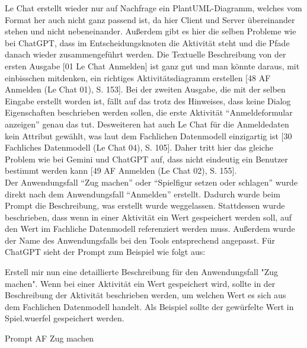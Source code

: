Le Chat erstellt wieder nur auf Nachfrage ein PlantUML-Diagramm, welches vom Format her auch nicht ganz passend ist, da hier Client und Server übereinander 
stehen und nicht nebeneinander. Außerdem gibt es hier die selben Probleme wie bei ChatGPT, dass im Entscheidungsknoten die Aktivität steht und die Pfade 
danach wieder zusammengeführt werden. Die Textuelle Beschreibung von der ersten Ausgabe [01 Le Chat Anmelden] ist ganz gut und man könnte daraus, mit 
einbisschen mitdenken, ein richtiges Aktivitätsdiagramm erstellen [48 AF Anmelden (Le Chat 01), S. 153]. Bei der zweiten Ausgabe, 
die mit der selben Eingabe erstellt worden ist, fällt auf 
das trotz des Hinweises, dass keine Dialog Eigenschaften beschrieben werden sollen, die erste Aktivität ``Anmeldeformular anzeigen'' genau das tut. 
Desweiteren hat auch Le Chat für die Anmeldedaten kein Attribut gewählt, was laut dem Fachlichen Datenmodell einzigartig ist 
[30 Fachliches Datenmodell (Le Chat 04), S. 105]. Daher tritt hier das gleiche 
Problem wie bei Gemini und ChatGPT auf, dass nicht eindeutig ein Benutzer bestimmt werden kann [49 AF Anmelden (Le Chat 02), S. 155].\\

Der Anwendungsfall ``Zug machen'' oder ``Spielfigur setzen oder schlagen'' wurde direkt nach dem Anwendungsfall ``Anmelden'' erstellt. Dadurch wurde
beim Prompt die Beschreibung, was erstellt wurde weggelassen. Stattdessen wurde beschrieben, dass wenn in einer Aktivität ein Wert gespeichert werden
soll, auf den Wert im Fachliche Datenmodell referenziert werden muss. Außerdem wurde der Name des Anwendungsfalls bei den Tools entsprechend angepasst. 
Für ChatGPT sieht der Prompt zum Beispiel wie folgt aus:

\begin{prompt}[H]
    \begin{tcolorbox}[colback=gray!20, colframe=gray!20, boxrule=0pt, sharp corners] 
        Erstell mir nun eine detaillierte Beschreibung für den Anwendungsfall "Zug machen". Wenn bei einer Aktivität ein Wert gespeichert wird, sollte 
        in der Beschreibung der Aktivität beschrieben werden, um welchen Wert es sich aus dem Fachlichen Datenmodell handelt. Als Beispiel sollte der 
        gewürfelte Wert in Spiel.wuerfel gespeichert werden.
        \vfill
    \end{tcolorbox}
    \caption{Prompt AF Zug machen}
    \label{Prompt AF Zug Machen}
\end{prompt}

